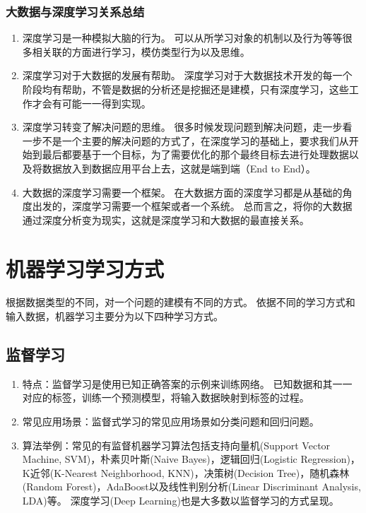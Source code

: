 \subsubsection{大数据与深度学习关系总结}
\begin{enumerate}
\item 深度学习是一种模拟大脑的行为。
可以从所学习对象的机制以及行为等等很多相关联的方面进行学习，模仿类型行为以及思维。
\item 深度学习对于大数据的发展有帮助。
深度学习对于大数据技术开发的每一个阶段均有帮助，不管是数据的分析还是挖掘还是建模，只有深度学习，这些工作才会有可能一一得到实现。
\item 深度学习转变了解决问题的思维。
很多时候发现问题到解决问题，走一步看一步不是一个主要的解决问题的方式了，在深度学习的基础上，要求我们从开始到最后都要基于一个目标，为了需要优化的那个最终目标去进行处理数据以及将数据放入到数据应用平台上去，这就是端到端（End to End）。
\item 大数据的深度学习需要一个框架。
在大数据方面的深度学习都是从基础的角度出发的，深度学习需要一个框架或者一个系统。
总而言之，将你的大数据通过深度分析变为现实，这就是深度学习和大数据的最直接关系。
\end{enumerate}

\section{机器学习学习方式}
\label{ux673aux5668ux5b66ux4e60ux5b66ux4e60ux65b9ux5f0f}
根据数据类型的不同，对一个问题的建模有不同的方式。
依据不同的学习方式和输入数据，机器学习主要分为以下四种学习方式。
\subsection{ 监督学习}
\label{ux76d1ux7763ux5b66ux4e60}
\begin{enumerate}
\item  特点：监督学习是使用已知正确答案的示例来训练网络。
已知数据和其一一对应的标签，训练一个预测模型，将输入数据映射到标签的过程。
\item  常见应用场景：监督式学习的常见应用场景如分类问题和回归问题。
\item 算法举例：常见的有监督机器学习算法包括支持向量机(Support Vector Machine, SVM)，朴素贝叶斯(Naive Bayes)，逻辑回归(Logistic Regression)，K近邻(K-Nearest Neighborhood, KNN)，决策树(Decision Tree)，随机森林(Random Forest)，AdaBoost以及线性判别分析(Linear Discriminant Analysis, LDA)等。
深度学习(Deep Learning)也是大多数以监督学习的方式呈现。
\end{enumerate}
